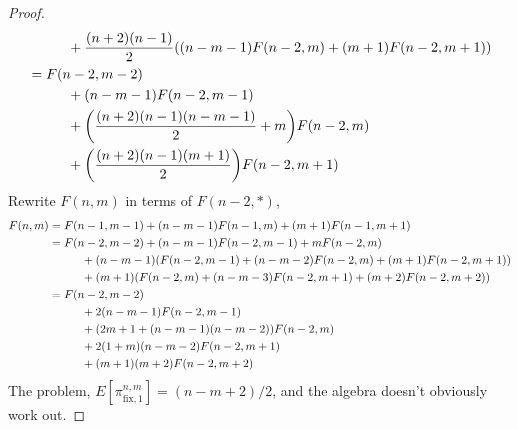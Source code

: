 \documentclass{article}
\let\originalleft\left
\let\originalright\right
\renewcommand{\left}{\mathopen{}\mathclose\bgroup\originalleft}
\renewcommand{\right}{\aftergroup\egroup\originalright}
\begin{document}
\begin{proof}
\begin{align}
    &\hspace{1cm}+ \frac{(n+2)(n-1)}{2}\left(
      (n - m - 1)F(n - 2, m) + (m + 1)F(n-2, m+1)
    \right) \\
    &= F(n - 2, m-2)\\
    &\hspace{1cm}+ (n - m - 1)F(n - 2, m-1)\\
    &\hspace{1cm}+ \left(\frac{(n+2)(n-1)(n-m-1)}{2} + m\right)F(n-2, m)\\
    &\hspace{1cm}+ \left(\frac{(n+2)(n-1)(m+1)}{2}\right)F(n-2, m+1)
  \end{align}
  Rewrite $F(n,m)$ in terms of $F(n-2, *)$,
  \begin{align}
    F(n,m) &=
    F(n - 1, m-1) +
    (n - m - 1)F(n - 1, m) +
    (m + 1)F(n-1, m + 1) \\
    &= %
    F(n-2, m-2) + (n - m - 1)F(n - 2, m-1) + m F(n-2, m) \\
    &\hspace{1cm}+ %
    (n-m-1)\left(F(n-2, m-1) + (n-m-2)F(n-2, m) + (m+1)F(n-2, m+1)\right)\\
    &\hspace{1cm}+ %
    (m+1)\left(F(n-2, m) + (n-m-3)F(n-2, m+1) + (m+2)F(n-2, m+2)\right)\\
    &= %
    F(n-2, m-2) \\
    &\hspace{1cm}+ 2(n-m-1)F(n-2, m-1) \\
    &\hspace{1cm}+ (2 m + 1 + (n - m - 1)(n - m - 2))F(n-2, m) \\
    &\hspace{1cm}+ 2(1+m)(n-m-2)F(n-2, m+1) \\
    &\hspace{1cm}+ (m+1)(m+2)F(n-2, m+2)
  \end{align}
  The problem, $E[\pi_{\text{fix},1}^{n,m}] = (n - m + 2)/2$, and the algebra doesn't
  obviously work out.
\end{proof}
\end{document}

